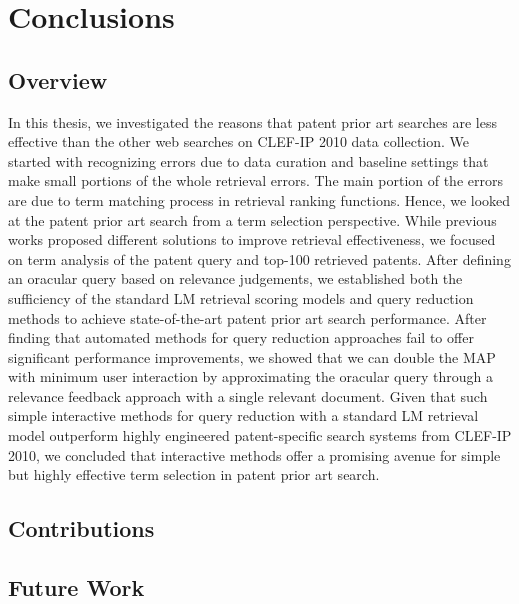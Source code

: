 \chapter{Conclusions}
\label{cha:conc}

\section{Overview}
\label{sec:overview}
In this thesis, we investigated the reasons that patent prior art searches 
are less effective than the other web searches on CLEF-IP 2010 data collection. 
We started with recognizing errors due to data curation and baseline settings that 
make small portions of the whole retrieval errors. The main portion of the errors are 
due to term matching process in retrieval ranking functions. 
Hence, we looked at the patent prior art search from
a term selection perspective. While previous works proposed
different solutions to improve retrieval effectiveness, we 
focused on term analysis of the patent query and top-100 retrieved patents. 
After defining an oracular query based on
relevance judgements, we established both the sufficiency
of the standard LM retrieval scoring models and query reduction 
methods to achieve state-of-the-art patent prior art
search performance. After finding that automated methods 
for query reduction approaches fail to offer significant
performance improvements, we showed that we can double
the MAP with minimum user interaction by approximating
the oracular query through a relevance feedback approach
with a single relevant document. Given that such simple 
interactive methods for query reduction with a standard LM
retrieval model outperform highly engineered patent-specific
search systems from CLEF-IP 2010, we concluded that interactive 
methods offer a promising avenue for simple but
highly effective term selection in patent prior art search.
 

\section{Contributions}
\label{sec:contributions}

\section{Future Work}
\label{sec:future}




